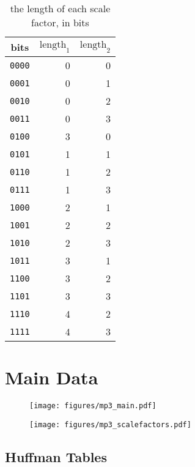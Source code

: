 \documentclass[letter]{scrbook}
\begin{document}
\begin{table}[h]
\begin{tabular}{|c|r|r|}
\hline
bits & $\text{length}_1$ & $\text{length}_2$ \\
\hline
\texttt{0000} & 0 & 0 \\
\texttt{0001} & 0 & 1 \\
\texttt{0010} & 0 & 2 \\
\texttt{0011} & 0 & 3 \\
\texttt{0100} & 3 & 0 \\
\texttt{0101} & 1 & 1 \\
\texttt{0110} & 1 & 2 \\
\texttt{0111} & 1 & 3 \\
\texttt{1000} & 2 & 1 \\
\texttt{1001} & 2 & 2 \\
\texttt{1010} & 2 & 3 \\
\texttt{1011} & 3 & 1 \\
\texttt{1100} & 3 & 2 \\
\texttt{1101} & 3 & 3 \\
\texttt{1110} & 4 & 2 \\
\texttt{1111} & 4 & 3 \\
\hline
\end{tabular}
\caption{the length of each scale factor, in bits}
\end{table}

\section{Main Data}

\begin{figure}[h]
\texttt{[image: figures/mp3\_main.pdf]}
\end{figure}

\begin{figure}[h]
\texttt{[image: figures/mp3\_scalefactors.pdf]}
\end{figure}

\clearpage

\subsection{Huffman Tables}
\end{document}

